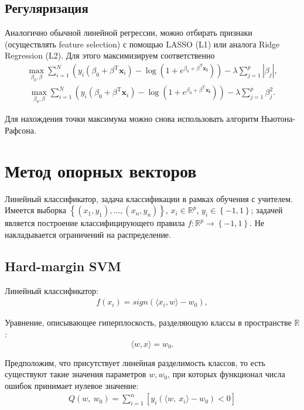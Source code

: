 \documentclass[12pt]{article}
\begin{document}
		\subsection{Регуляризация}
	Аналогично обычной линейной регрессии, можно отбирать признаки (осуществлять feature selection) с помощью LASSO (L1) или аналога Ridge Regression (L2). Для этого максимизируем соответственно
	\begin{align*}
		\max_{\beta_0, \beta} \sum\limits_{i = 1}^N \left( y_i(\beta_0 + \beta^\mathrm{T}\mathbf{x}_i) - \log (1 + e^{\beta_0 + \beta^\mathrm{T}\mathbf{x_i}})\right) - \lambda \sum\limits_{j = 1}^p |\beta_j|,
	\end{align*}
	\begin{align*}
		\max_{\beta_0, \beta} \sum\limits_{i = 1}^N \left( y_i(\beta_0 + \beta^\mathrm{T}\mathbf{x}_i) - \log (1 + e^{\beta_0 + \beta^\mathrm{T}\mathbf{x_i}})\right) - \lambda \sum\limits_{j = 1}^p \beta_j^2.
	\end{align*}
	
	Для нахождения точки максимума можно снова использовать алгоритм Ньютона-Рафсона.
	
	\newpage
	
	\section{Метод опорных векторов}
	
	Линейный классификатор, задача классификации в рамках обучения с учителем.
	Имеется выборка $\left\{\left(x_1, y_1\right), \dots, \left(x_n, y_n\right)\right\}$, $x_i\in\mathbb{R}^p$, $y_i\in\left\{-1, 1\right\}$;
	задачей является построение классифицирующего правила $f:\mathbb{R}^p\rightarrow \left\{-1, 1\right\}$. Не накладывается ограничений на распределение.
	
	\subsection{Hard-margin SVM}
	
	Линейный классификатор:
	\begin{eqnarray}
	f\left({x}_i\right)=sign\left(\langle{x}_i,{w}\rangle -w_0\right),
	\end{eqnarray}
	
	Уравнение, описывающее гиперплоскость, разделяющую классы в пространстве $\mathbb{R}$:
	$$
	\langle w, x \rangle = w_0. 
	$$
	
	Предположим, что присутствует линейная разделимость классов, то есть существуют такие значения параметров $w, w_0$, при которых функционал числа ошибок принимает нулевое значение:
	\begin{eqnarray}
	Q(w,\ w_{0})=\sum_{i=1}^{n}[y_{i}(\langle w,\ x_{i}\rangle-w_{0})<0]
	\end{eqnarray}
	
\end{document}
